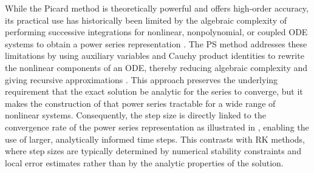 \documentclass{article}
\begin{document}

While the Picard method is theoretically powerful and offers high-order accuracy, its practical use has historically been limited by the algebraic complexity of performing successive integrations for nonlinear, nonpolynomial, or coupled ODE systems to obtain a power series representation \cite{Ansari2024, Leal2015, Rudmin1998}. The PS method addresses these limitations by using auxiliary variables and Cauchy product identities to rewrite the nonlinear components of an ODE, thereby reducing algebraic complexity and giving recursive approximations \cite{Parker1996, Guenther2019}. This approach preserves the underlying requirement that the exact solution be analytic for the series to converge, but it makes the construction of that power series tractable for a wide range of nonlinear systems. Consequently, the step size is directly linked to the convergence rate of the power series representation as illustrated in \cite{Parker1996}, enabling the use of larger, analytically informed time steps. This contrasts with RK methods, where step sizes are typically determined by numerical stability constraints and local error estimates rather than by the analytic properties of the solution.



\end{document}
